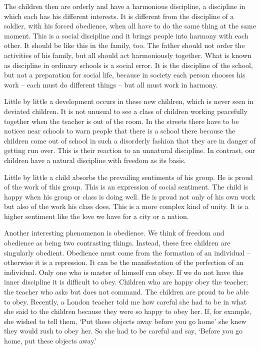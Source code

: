 \documentclass[lang=cn,10pt]{elegantbook}
\begin{document}
The children then are orderly and have a harmonious discipline, a discipline in which each has his different interests. It is different from the discipline of a soldier, with his forced obedience, when all have to do the same thing at the same moment. This is a social discipline and it brings people into harmony with each other. It should be like this in the family, too. The father should not order the activities of his family, but all should act harmoniously together. What is known as discipline in ordinary schools is a social error. It is the discipline of the school, but not a preparation for social life, because in society each person chooses his work – each must do different things – but all must work in harmony.

Little by little a development occurs in these new children, which is never seen in deviated children. It is not unusual to see a class of children working peacefully together when the teacher is out of the room. In the streets there have to be notices near schools to warn people that there is a school there because the children come out of school in such a disorderly fashion that they are in danger of getting run over. This is their reaction to an unnatural discipline. In contrast, our children have a natural discipline with freedom as its basis.

Little by little a child absorbs the prevailing sentiments of his group. He is proud of the work of this group. This is an expression of social sentiment. The child is happy when his group or class is doing well. He is proud not only of his own work but also of the work his class does. This is a more complex kind of unity. It is a higher sentiment like the love we have for a city or a nation.

Another interesting phenomenon is obedience. We think of freedom and obedience as being two contrasting things. Instead, these free children are singularly obedient. Obedience must come from the formation of an individual – otherwise it is a repression. It can be the manifestation of the perfection of an individual. Only one who is master of himself can obey. If we do not have this inner discipline it is difficult to obey. Children who are happy obey the teacher; the teacher who asks but does not command. The children are proud to be able to obey. Recently, a London teacher told me how careful she had to be in what she said to the children because they were so happy to obey her. If, for example, she wished to tell
them, ‘Put these objects away before you go home’ she knew they would rush to obey her. So she had to be careful and say, ‘Before you go home, put these objects away.’
\end{document}
